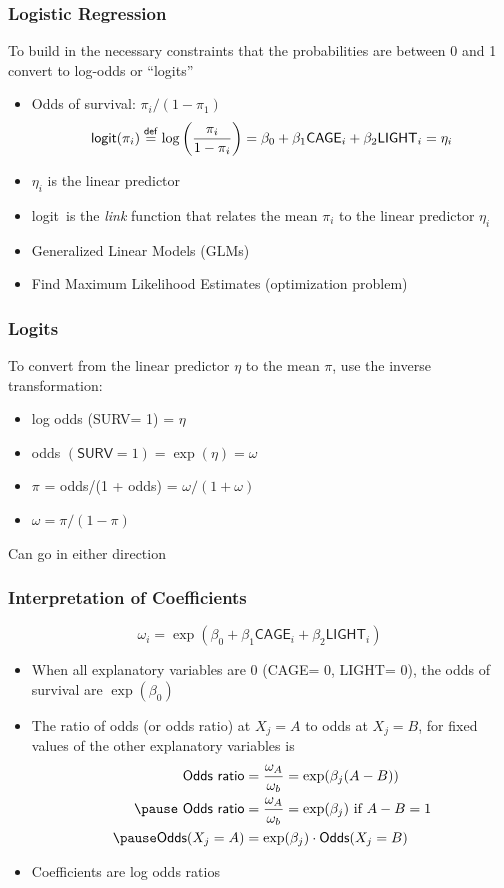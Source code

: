 \documentclass[handout]{beamer}\usepackage[]{graphicx}\usepackage[]{color}
\def\logit{\textsf{logit}}
\def\C{\textsf{CAGE}}
\def\L{\textsf{LIGHT}}
\def\S{\textsf{SURV}}
\begin{document}
\begin{frame}\frametitle{Logistic Regression}
To build in the necessary constraints that the probabilities are
between 0 and 1 convert to log-odds or ``logits'' \pause
\begin{itemize}
\item Odds of survival: $\pi_i/(1 - \pi_1)$ \pause
$$ \logit(\pi_i) \stackrel{\sf def}{=} \log\left(\frac {\pi_i} {1 -
    \pi_i} \right) = \beta_0 + \beta_1 \C_i + \beta_2 \L_i = \eta_i$$ \pause
\item $\eta_i$ is the linear predictor \pause
\item \logit\  is the {\it link} function that relates the mean $\pi_i$
  to the linear predictor $\eta_i$ \pause
\item Generalized Linear Models (GLMs) \pause
\item Find Maximum Likelihood Estimates (optimization problem)
\end{itemize}
\end{frame}


\begin{frame}\frametitle{Logits}
To convert from the linear predictor $\eta$ to the mean $\pi$,
  use the inverse transformation: \pause
  \begin{itemize}
\item log odds (\S = 1) = $\eta$ \pause
\item odds $(\S = 1) = \exp(\eta) = \omega$ \pause
\item $\pi$ = odds/(1 + odds) = $\omega/(1 + \omega)$ \pause
\item $\omega = \pi/(1 - \pi)$ \pause
  \end{itemize}
Can go in either direction
\end{frame}

\begin{frame}\frametitle{Interpretation of Coefficients}
$$\omega_i = \exp(\beta_0 + \beta_1 \C_i + \beta_2 \L_i)$$ \pause
\begin{itemize}
\item When all explanatory variables are 0 (\C = 0, \L = 0), the odds
  of survival are $\exp(\beta_0)$ \pause
\item The ratio of odds (or odds ratio) at $X_j = A$ to odds at $X_j =
  B$, for fixed values of the other explanatory variables is
  \begin{align*}
   \textsf{ Odds ratio} &= \frac{\omega_A}{\omega_b}  = \exp(\beta_j
   (A - B)) \\  \pause
 \textsf{ Odds ratio} &= \frac{\omega_A}{\omega_b}  = \exp(\beta_j)
   \text{ if } A - B = 1\\ \pause
\textsf{Odds}(X_j = A) &= \exp(\beta_j) \cdot \textsf{Odds}(X_j = B)
  \end{align*}
\item Coefficients are log odds ratios \pause
\end{itemize}
\end{frame}
\end{document}
